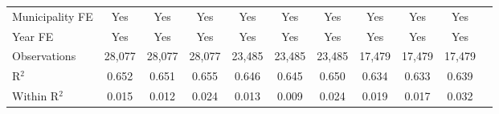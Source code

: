 \documentclass{article}
\begin{document}
\begin{table}[htbp]
\begin{adjustbox}{width=\textwidth}
\begin{tabular}{lcccccccccc}
\midrule
Municipality FE & Yes & Yes & Yes & Yes & Yes & Yes & Yes & Yes & Yes \\
Year FE & Yes & Yes & Yes & Yes & Yes & Yes & Yes & Yes & Yes \\
\midrule
Observations & 28,077 & 28,077 & 28,077 & 23,485 & 23,485 & 23,485 & 17,479 & 17,479 & 17,479 \\
R$^2$ & 0.652 & 0.651 & 0.655 & 0.646 & 0.645 & 0.650 & 0.634 & 0.633 & 0.639 \\
Within R$^2$ & 0.015 & 0.012 & 0.024 & 0.013 & 0.009 & 0.024 & 0.019 & 0.017 & 0.032 \\
\bottomrule
\end{tabular}
\end{adjustbox}
\end{table}
\end{document}
